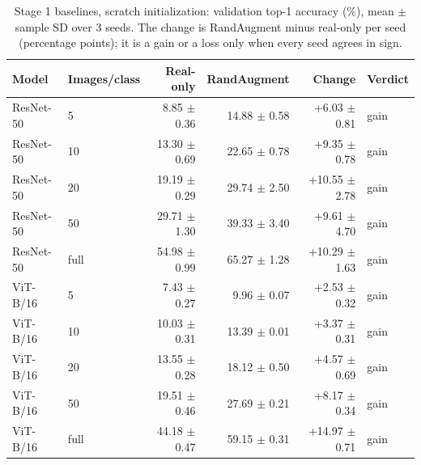 \begin{table}[H]
\centering
\caption{Stage 1 baselines, scratch initialization: validation top-1 accuracy (\%), mean $\pm$ sample SD over 3 seeds. The change is RandAugment minus real-only per seed (percentage points); it is a gain or a loss only when every seed agrees in sign.}
\label{tab:stage1-scratch-accuracy}
\begin{tabular}{llrrrl}
\toprule
Model & Images/class & Real-only & RandAugment & Change & Verdict \\
\midrule
ResNet-50 & 5 & 8.85 $\pm$ 0.36 & 14.88 $\pm$ 0.58 & +6.03 $\pm$ 0.81 & gain \\
ResNet-50 & 10 & 13.30 $\pm$ 0.69 & 22.65 $\pm$ 0.78 & +9.35 $\pm$ 0.78 & gain \\
ResNet-50 & 20 & 19.19 $\pm$ 0.29 & 29.74 $\pm$ 2.50 & +10.55 $\pm$ 2.78 & gain \\
ResNet-50 & 50 & 29.71 $\pm$ 1.30 & 39.33 $\pm$ 3.40 & +9.61 $\pm$ 4.70 & gain \\
ResNet-50 & full & 54.98 $\pm$ 0.99 & 65.27 $\pm$ 1.28 & +10.29 $\pm$ 1.63 & gain \\
\midrule
ViT-B/16 & 5 & 7.43 $\pm$ 0.27 & 9.96 $\pm$ 0.07 & +2.53 $\pm$ 0.32 & gain \\
ViT-B/16 & 10 & 10.03 $\pm$ 0.31 & 13.39 $\pm$ 0.01 & +3.37 $\pm$ 0.31 & gain \\
ViT-B/16 & 20 & 13.55 $\pm$ 0.28 & 18.12 $\pm$ 0.50 & +4.57 $\pm$ 0.69 & gain \\
ViT-B/16 & 50 & 19.51 $\pm$ 0.46 & 27.69 $\pm$ 0.21 & +8.17 $\pm$ 0.34 & gain \\
ViT-B/16 & full & 44.18 $\pm$ 0.47 & 59.15 $\pm$ 0.31 & +14.97 $\pm$ 0.71 & gain \\
\bottomrule
\end{tabular}
\end{table}
